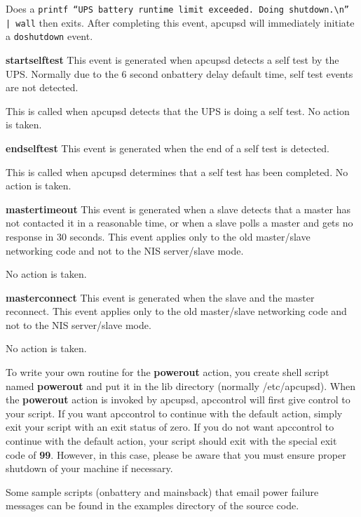 {{{{{{{{{\begin{description}
Does a {\tt printf ``UPS battery runtime limit exceeded. Doing
shutdown.\textbackslash{}n'' | wall} then exits. After completing this event,
apcupsd will immediately initiate a {\tt doshutdown} event.  

\item {\bf startselftest}
This event is generated when apcupsd detects a self test by the UPS. Normally
due to the 6 second onbattery delay default time, self test events are not
detected.  

This is called when apcupsd detects that the UPS is doing a self test. No
action is taken.  

\item {\bf endselftest}
This event is generated when the end of a self test is detected.  

This is called when apcupsd determines that a self test has been completed. No
action is taken.  

\item {\bf mastertimeout}
This event is generated when a slave detects that a master has not contacted
it in a reasonable time, or when a slave polls a master and gets no response
in 30 seconds. This event applies only to the old master/slave networking code
and not to the NIS server/slave mode.  

No action is taken.  

\item {\bf masterconnect}
This event is generated when the slave and the master reconnect. This event
applies only to the old master/slave networking code and not to the NIS
server/slave mode.  

No action is taken. 
\end{description}

To write your own routine for the {\bf powerout} action, you create shell
script named {\bf powerout} and put it in the lib directory (normally
/etc/apcupsd).  When the {\bf powerout} action is invoked by apcupsd,
apccontrol will first give control to your script.  If you want apccontrol to
continue with the default action, simply exit your script with an exit status
of zero.  If you do not want apccontrol to continue with the default action,
your script should exit with the special exit code of {\bf 99}.  However, in
this case, please be aware that you must ensure proper shutdown of your
machine if necessary.  

Some sample scripts (onbattery and mainsback) that email power failure
messages can be found in the examples directory of the source code. 

}}}}}}}}}
